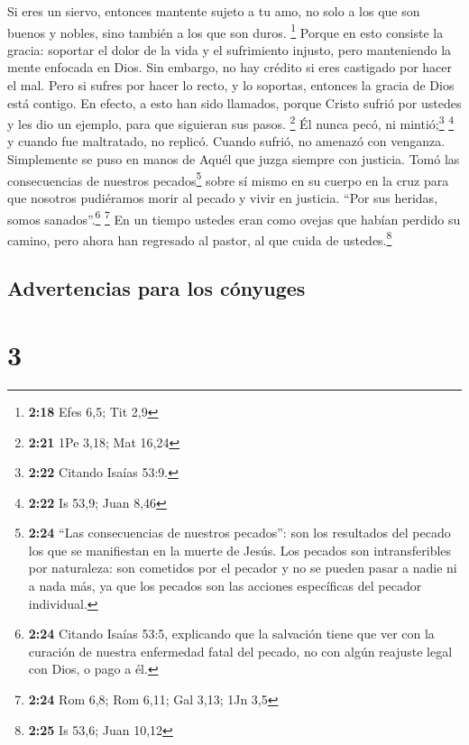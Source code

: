  Si eres un siervo, entonces mantente sujeto a tu amo, no
solo a los que son buenos y nobles, sino también a los que son duros.
\footnote{\textbf{2:18} Efes 6,5; Tit 2,9}  Porque en
esto consiste la gracia: soportar el dolor de la vida y el sufrimiento
injusto, pero manteniendo la mente enfocada en Dios.  Sin
embargo, no hay crédito si eres castigado por hacer el mal. Pero si
sufres por hacer lo recto, y lo soportas, entonces la gracia de Dios
está contigo.  En efecto, a esto han sido llamados,
porque Cristo sufrió por ustedes y les dio un ejemplo, para que
siguieran sus pasos. \footnote{\textbf{2:21} 1Pe 3,18; Mat 16,24}
 Él nunca pecó, ni mintió;\footnote{\textbf{2:22} Citando
  Isaías 53:9.} \footnote{\textbf{2:22} Is 53,9; Juan 8,46}
 y cuando fue maltratado, no replicó. Cuando sufrió, no
amenazó con venganza. Simplemente se puso en manos de Aquél que juzga
siempre con justicia.  Tomó las consecuencias de nuestros
pecados\footnote{\textbf{2:24} ``Las consecuencias de nuestros
  pecados'': son los resultados del pecado los que se manifiestan en la
  muerte de Jesús. Los pecados son intransferibles por naturaleza: son
  cometidos por el pecador y no se pueden pasar a nadie ni a nada más,
  ya que los pecados son las acciones específicas del pecador
  individual.} sobre sí mismo en su cuerpo en la cruz para que nosotros
pudiéramos morir al pecado y vivir en justicia. ``Por sus heridas, somos
sanados''.\footnote{\textbf{2:24} Citando Isaías 53:5, explicando que la
  salvación tiene que ver con la curación de nuestra enfermedad fatal
  del pecado, no con algún reajuste legal con Dios, o pago a él.}
\footnote{\textbf{2:24} Rom 6,8; Rom 6,11; Gal 3,13; 1Jn 3,5}
 En un tiempo ustedes eran como ovejas que habían perdido
su camino, pero ahora han regresado al pastor, al que cuida de
ustedes.\footnote{\textbf{2:25} Is 53,6; Juan 10,12}

\hypertarget{advertencias-para-los-cuxf3nyuges}{%
\subsection{Advertencias para los
cónyuges}\label{advertencias-para-los-cuxf3nyuges}}

\hypertarget{section-2}{%
\section{3}\label{section-2}}


